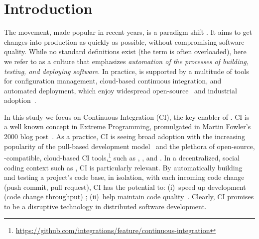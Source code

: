 
\section{Introduction}

The \DO movement, made popular in recent years, is a paradigm shift 
\cite{degrandis2011devops, loukides2012devops, humble2011enterprises, 
roche2013adopting}.
It aims to get changes into production as quickly as 
possible, without compromising software quality.
While no standard definitions exist (the term is often overloaded), here
we refer to \DO as a culture that emphasizes \emph{automation of the 
processes of building, testing, and deploying software}.
In practice, \DO is supported by a multitude of tools for configuration 
management, cloud-based continuous integration, and automated deployment,
which enjoy widespread open-source~\cite{Hilton2016} and industrial 
adoption~\cite{rightscale, hilton2016continuous}.

In this study we focus on Continuous Integration (CI), the key enabler of \DO.
CI is a well known concept in Extreme Programming, promulgated in 
Martin Fowler's 2000 blog post~\cite{fowler2000continuous}.
As a practice, CI is seeing broad adoption with the increasing popularity
of the \GH pull-based development model~\cite{gousios2014exploratory}
and the plethora of open-source, \GH-compatible, cloud-based CI 
tools,\footnote{\url{https://github.com/integrations/feature/continuous-integration}}
such as \Tvis, \CB, and \CCI.
In a decentralized, social coding context such as \GH, CI is particularly relevant. 
By automatically building and testing a project's code base, in isolation, 
with each incoming code change (\ie push commit, pull request), CI 
has the potential to: (i)~speed up development (code change throughput)
\cite{Stolberg, pham2013creating, Hilton2016};
(ii)~help maintain code quality~\cite{VasilescuYWDF15, gousios2015work}.
Clearly, CI promises to be a disruptive technology in distributed software
development.

